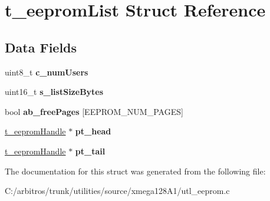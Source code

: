\hypertarget{structt__eeprom_list}{\section{t\-\_\-eeprom\-List Struct Reference}
\label{structt__eeprom_list}
}
\subsection*{Data Fields}
\begin{DoxyCompactItemize}
\item 
\hypertarget{structt__eeprom_list_a65907c8d88006e5cdc5e6b18eb4606ba}{uint8\-\_\-t {\bfseries c\-\_\-num\-Users}}\label{structt__eeprom_list_a65907c8d88006e5cdc5e6b18eb4606ba}

\item 
\hypertarget{structt__eeprom_list_a28741bbc497d5a353d88ac3b33cbc972}{uint16\-\_\-t {\bfseries s\-\_\-list\-Size\-Bytes}}\label{structt__eeprom_list_a28741bbc497d5a353d88ac3b33cbc972}

\item 
\hypertarget{structt__eeprom_list_aa34d61f8268b4fafa8dd03db10353ba3}{bool {\bfseries ab\-\_\-free\-Pages} \mbox{[}E\-E\-P\-R\-O\-M\-\_\-\-N\-U\-M\-\_\-\-P\-A\-G\-E\-S\mbox{]}}\label{structt__eeprom_list_aa34d61f8268b4fafa8dd03db10353ba3}

\item 
\hypertarget{structt__eeprom_list_a8f7e1b1312a47b6056ead1d3317b347d}{\hyperlink{structeeprom}{t\-\_\-eeprom\-Handle} $\ast$ {\bfseries pt\-\_\-head}}\label{structt__eeprom_list_a8f7e1b1312a47b6056ead1d3317b347d}

\item 
\hypertarget{structt__eeprom_list_a5e4740612f46ad9fb17f6b6a856b325e}{\hyperlink{structeeprom}{t\-\_\-eeprom\-Handle} $\ast$ {\bfseries pt\-\_\-tail}}\label{structt__eeprom_list_a5e4740612f46ad9fb17f6b6a856b325e}

\end{DoxyCompactItemize}


The documentation for this struct was generated from the following file\-:\begin{DoxyCompactItemize}
\item 
C\-:/arbitros/trunk/utilities/source/xmega128\-A1/utl\-\_\-eeprom.\-c\end{DoxyCompactItemize}
